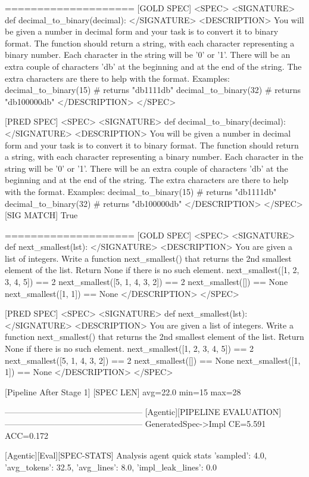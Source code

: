 ====================
[GOLD SPEC]
<SPEC> <SIGNATURE> def decimal_to_binary(decimal): </SIGNATURE> <DESCRIPTION> You will be given a number in decimal form and your task is to convert it to binary format. The function should return a string, with each character representing a binary number. Each character in the string will be '0' or '1'. There will be an extra couple of characters 'db' at the beginning and at the end of the string. The extra characters are there to help with the format. Examples: decimal_to_binary(15) # returns "db1111db" decimal_to_binary(32) # returns "db100000db" </DESCRIPTION> </SPEC>

[PRED SPEC]
<SPEC> <SIGNATURE> def decimal_to_binary(decimal): </SIGNATURE> <DESCRIPTION> You will be given a number in decimal form and your task is to convert it to binary format. The function should return a string, with each character representing a binary number. Each character in the string will be '0' or '1'. There will be an extra couple of characters 'db' at the beginning and at the end of the string. The extra characters are there to help with the format. Examples: decimal_to_binary(15) # returns "db1111db" decimal_to_binary(32) # returns "db100000db" </DESCRIPTION> </SPEC>
[SIG MATCH] True

====================
[GOLD SPEC]
<SPEC> <SIGNATURE> def next_smallest(lst): </SIGNATURE> <DESCRIPTION> You are given a list of integers. Write a function next_smallest() that returns the 2nd smallest element of the list. Return None if there is no such element. next_smallest([1, 2, 3, 4, 5]) == 2 next_smallest([5, 1, 4, 3, 2]) == 2 next_smallest([]) == None next_smallest([1, 1]) == None </DESCRIPTION> </SPEC>

[PRED SPEC]
<SPEC> <SIGNATURE> def next_smallest(lst): </SIGNATURE> <DESCRIPTION> You are given a list of integers. Write a function next_smallest() that returns the 2nd smallest element of the list. Return None if there is no such element. next_smallest([1, 2, 3, 4, 5]) == 2 next_smallest([5, 1, 4, 3, 2]) == 2 next_smallest([]) == None next_smallest([1, 1]) == None </DESCRIPTION> </SPEC>

[Pipeline After Stage 1]
[SPEC LEN] avg=22.0 min=15 max=28

--------------------------------------------------
[Agentic][PIPELINE EVALUATION]
--------------------------------------------------
GeneratedSpec->Impl  CE=5.591 ACC=0.172

[Agentic][Eval][SPEC-STATS] Analysis agent quick stats
{'sampled': 4.0, 'avg_tokens': 32.5, 'avg_lines': 8.0, 'impl_leak_lines': 0.0}

